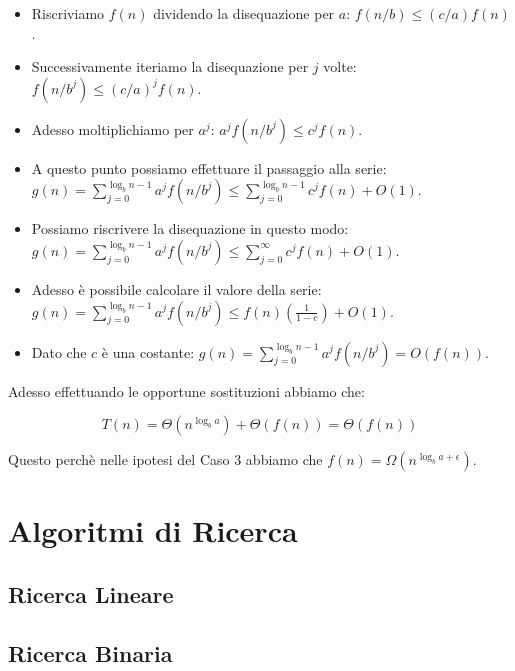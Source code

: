 \documentclass{article}
\begin{document}
\begin{itemize}
    \item Riscriviamo $f(n)$ dividendo la disequazione per $a$: $f(n/b) \leq (c/a) f(n)$.
    \item Successivamente iteriamo la disequazione per $j$ volte: $f(n/b^j) \leq (c/a)^j f(n)$.
    \item Adesso moltiplichiamo per $a^j$: $a^j f(n/b^j) \leq c^j f(n)$.
    \item A questo punto possiamo effettuare il passaggio alla serie: $\displaystyle g(n) = \sum_{j = 0}^{\log_{b} n - 1} a^j f(n/b^j) \leq \sum_{j = 0}^{\log_{b} n - 1} c^j f(n) + O(1)$.
    \item Possiamo riscrivere la disequazione in questo modo: $\displaystyle g(n) = \sum_{j = 0}^{\log_{b} n - 1} a^j f(n/b^j) \leq \sum_{j = 0}^{\infty} c^j f(n) + O(1)$.
    \item Adesso è possibile calcolare il valore della serie: $\displaystyle g(n) = \sum_{j = 0}^{\log_{b} n - 1} a^j f(n/b^j) \leq f(n) (\frac{1}{1 - c}) + O(1)$.
    \item Dato che $c$ è una costante: $\displaystyle g(n) = \sum_{j = 0}^{\log_{b} n - 1} a^j f(n/b^j) = O(f(n))$.
\end{itemize}

Adesso effettuando le opportune sostituzioni abbiamo che:

\begin{equation*}
    T(n) = \Theta(n^{\log_{b}a}) + \Theta(f(n)) = \Theta(f(n))
\end{equation*}

Questo perchè nelle ipotesi del Caso 3 abbiamo che $f(n) = \Omega(n^{\log_{b}a + \epsilon})$.

\section{Algoritmi di Ricerca}

\subsection{Ricerca Lineare}



\subsection{Ricerca Binaria}


\end{document}
